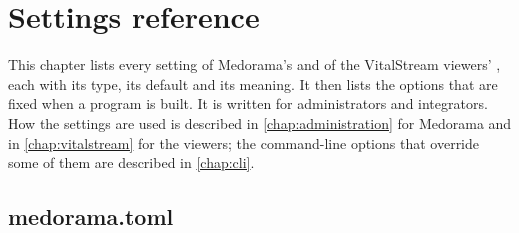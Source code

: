 \chapter{Settings reference}
\label{chap:settings-reference}

This chapter lists every setting of Medorama's  and of the VitalStream
viewers' , each with its type, its default and its meaning. It then lists
the options that are fixed when a program is built. It is written for administrators and
integrators. How the settings are used is described in \cref{chap:administration} for Medorama
and in \cref{chap:vitalstream} for the viewers; the command-line options that override some of
them are described in \cref{chap:cli}.

\section{medorama.toml}
\label{sec:settings-reference-medorama}


